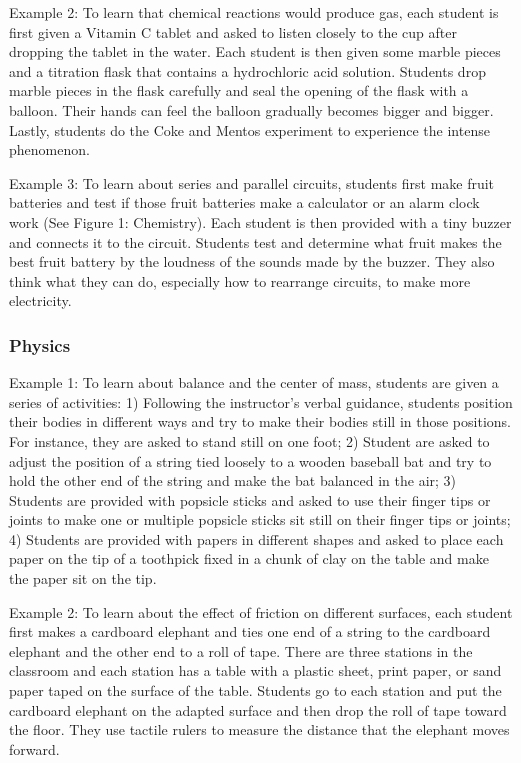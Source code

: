 \documentclass[11.5pt]{sig-alternate} %
\begin{document}
\begin{large}
Example 2: To learn that chemical reactions would produce gas, each student is first given a Vitamin C tablet and asked to listen closely to the cup after dropping the tablet in the water. Each student is then given some marble pieces and a titration flask that contains a hydrochloric acid solution. Students drop marble pieces in the flask carefully and seal the opening of the flask with a balloon. Their hands can feel the balloon gradually becomes bigger and bigger. Lastly, students do the Coke and Mentos experiment to experience the intense phenomenon.

Example 3: To learn about series and parallel circuits, students first make fruit batteries and test if those fruit batteries make a calculator or an alarm clock work (See Figure 1: Chemistry). Each student is then provided with a tiny buzzer and connects it to the circuit. Students test and determine what fruit makes the best fruit battery by the loudness of the sounds made by the buzzer. They also think what they can do, especially how to rearrange circuits, to make more electricity.

\subsubsection*{Physics}

Example 1: To learn about balance and the center of mass, students are given a series of activities: 1) Following the instructor’s verbal guidance, students position their bodies in different ways and try to make their bodies still in those positions. For instance, they are asked to stand still on one foot; 2) Student are asked to adjust the position of a string tied loosely to a wooden baseball bat and try to hold the other end of the string and make the bat balanced in the air; 3) Students are provided with popsicle sticks and asked to use their finger tips or joints to make one or multiple popsicle sticks sit still on their finger tips or joints; 4) Students are provided with papers in different shapes and asked to place each paper on the tip of a toothpick fixed in a chunk of clay on the table and make the paper sit on the tip.

Example 2: To learn about the effect of friction on different surfaces, each student first makes a cardboard elephant and ties one end of a string to the cardboard elephant and the other end to a roll of tape. There are three stations in the classroom and each station has a table with a plastic sheet, print paper, or sand paper taped on the surface of the table. Students go to each station and put the cardboard elephant on the adapted surface and then drop the roll of tape toward the floor. They use tactile rulers to measure the distance that the elephant moves forward.


\end{large}
\end{document}
